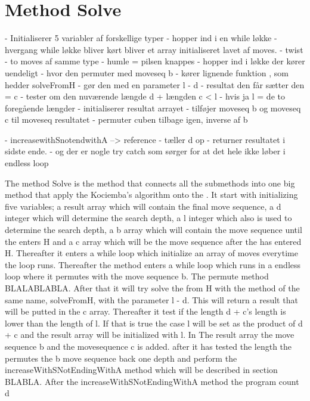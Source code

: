 \section{Method Solve}

- Initialiserer 5 variabler af forskellige typer
- hopper ind i en while l\o{}kke
- hvergang while l\o{}kke bliver k\o{}rt bliver et array initialiseret lavet af moves.
- twist
- to moves af samme type
-  humle = pilsen knappes
- hopper ind i l\o{}kke der k\o{}rer uendeligt
- hvor den permuter med moveseq b
- k\o{}rer lignende funktion , som hedder solveFromH
- g\o{}r den med en parameter l - d
- resultat den f\aa{}r s\ae{}tter den = c
- tester om den nuv\ae{}rende l\ae{}ngde d + l\ae{}ngden c < l
- hvis ja l = de to foreg\aa{}ende l\ae{}ngder
- initialiserer resultat arrayet
- tilf\o{}jer moveseq b og moveseq c til moveseq resultatet
- permuter cuben tilbage igen, inverse af b

- increasewithSnotendwithA --> reference
- t\ae{}ller d op
- returner resultatet i sidste ende.
-  og der er nogle try catch som s\o{}rger for at det hele ikke l\o{}ber i endless loop

The method Solve is the method that connects all the submethods into one big method that apply the Kociemba's algorithm onto the \rubik{}. It start with initializing five variables; a result array which will contain the final move sequence, a d integer which will determine the search depth, a l integer which also is used to determine the search depth, a b array which will contain the move sequence until the \rubik{} enters H and a c array which will be the move sequence after the \rubik{} has entered H. Thereafter it enters a while loop which initialize an array of moves everytime the loop runs. Thereafter the method enters a while loop which runs in a endless loop where it permutes with the move sequence b. The permute method BLALABLABLA. After that it will try solve the \rubik{} from H with the method of the same name, solveFromH, with the parameter l - d.  This will return a result that will be putted in the c array. Thereafter it test if the length d + c's length is lower than the length of l. If that is true the case l will be set as the product of d + c and the result array will be initialized with l. In The result array the move sequence b and the movesequence c is added. after it has tested the length the \rubik{}  permutes the b move sequence back one depth and perform the increaseWithSNotEndingWithA method which will be described in section BLABLA. After the increaseWithSNotEndingWithA method the program count d 



